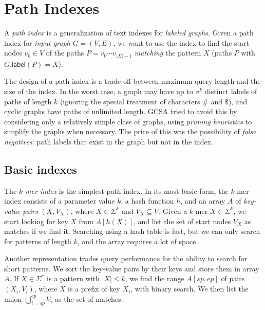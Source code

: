 \documentclass[a4paper,UKenglish]{lipics-v2016}
\newcommand{\abs}[1]{\ensuremath{\lvert #1 \rvert}}
\newcommand{\glabel}{\ensuremath{\mathsf{label}}}
\newcommand{\kmer}[1]{$#1$\nobreakdash-mer}
\begin{document}
\section{Path Indexes}\label{sect:path-indexes}

A \emph{path index} is a generalization of text indexes for \emph{labeled graphs}. Given a path index for \emph{input graph} $G = (V, E)$, we want to use the index to find the start nodes $v_{0} \in V$ of the paths $P = v_{0} \dotsm v_{\abs{X}-1}$ \emph{matching} the pattern $X$ (paths $P$ with $G.\glabel(P) = X$).

The design of a path index is a trade-off between maximum query length and the size of the index. In the worst case, a graph may have up to $\sigma^{k}$ distinct labels of paths of length $k$ (ignoring the special treatment of characters $\#$ and $\$$), and cyclic graphs have paths of unlimited length. GCSA \cite{Siren2014} tried to avoid this by considering only a relatively simple class of graphs, using \emph{pruning heuristics} to simplify the graphs when necessary. The price of this was the possibility of \emph{false negatives}: path labels that exist in the graph but not in the index.

\subsection{Basic indexes}

The \emph{\kmer{k} index} is the simplest path index. In its most basic form, the \kmer{k} index consists of a parameter value $k$, a hash function $h$, and an array $A$ of \emph{key-value pairs} $(X, V_{X})$, where $X \in \Sigma^{k}$ and $V_{X} \subseteq V$. Given a \kmer{k} $X \in \Sigma^{k}$, we start looking for key $X$ from $A[h(X)]$, and list the set of start nodes $V_{X}$ as matches if we find it. Searching using a hash table is fast, but we can only search for patterns of length $k$, and the array requires a lot of space.

Another representation trades query performance for the ability to search for short patterns. We sort the key-value pairs by their keys and store them in array $A$. If $X \in \Sigma^{\ast}$ is a pattern with $\abs{X} \le k$, we find the range $A[sp, ep]$ of pairs $(X_{i}, V_{i})$, where $X$ is a prefix of key $X_{i}$, with binary search. We then list the union $\bigcup_{i=sp}^{ep} V_{i}$ as the set of matches.
\end{document}
